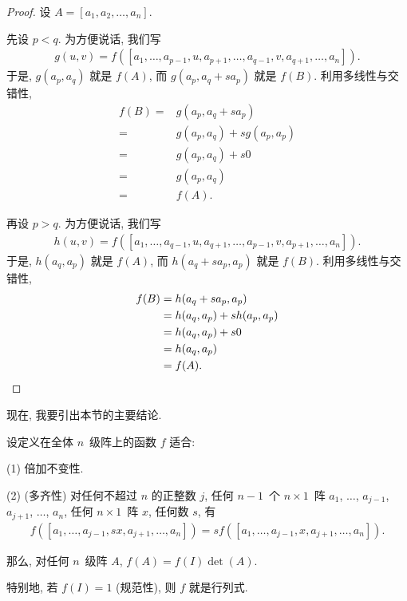 \begin{proof}
    设 \(A = [a_1, a_2, \dots, a_n]\).

    先设 \(p < q\).
    为方便说话, 我们写
    \begin{align*}
        g(u, v)
        = f {([a_1, \dots, a_{p-1}, u, a_{p+1}, \dots,
                        a_{q-1}, v, a_{q+1}, \dots, a_n])}.
    \end{align*}
    于是, \(g(a_p, a_q)\) 就是 \(f(A)\),
    而 \(g(a_p, a_q + sa_p)\) 就是 \(f(B)\).
    利用多线性与交错性,
    \begin{align*}
        f(B)
        = {} & g(a_p, a_q + sa_p)         \\
        = {} & g(a_p, a_q) + sg(a_p, a_p) \\
        = {} & g(a_p, a_q) + s0           \\
        = {} & g(a_p, a_q)                \\
        = {} & f(A).
    \end{align*}

    再设 \(p > q\).
    为方便说话, 我们写
    \begin{align*}
        h(u, v)
        = f {([a_1, \dots, a_{q-1}, u, a_{q+1}, \dots,
                        a_{p-1}, v, a_{p+1}, \dots, a_n])}.
    \end{align*}
    于是, \(h(a_q, a_p)\) 就是 \(f(A)\),
    而 \(h(a_q + sa_p, a_p)\) 就是 \(f(B)\).
    利用多线性与交错性,
    \begin{align*}
        f(B)
        = {} & h(a_q + sa_p, a_p)         \\
        = {} & h(a_q, a_p) + sh(a_p, a_p) \\
        = {} & h(a_q, a_p) + s0           \\
        = {} & h(a_q, a_p)                \\
        = {} & f(A).
        \qedhere
    \end{align*}
\end{proof}

现在, 我要引出本节的主要结论.

\begin{theorem}
    设定义在全体 \(n\)~级阵上的函数 \(f\) 适合:

    (1)
    倍加不变性.

    (2)
    (多齐性)
    对任何不超过 \(n\) 的正整数 \(j\),
    任何 \(n-1\)~个 \(n \times 1\)~阵
    \(a_1\), \(\dots\), \(a_{j-1}\),
    \(a_{j+1}\), \(\dots\), \(a_n\),
    任何 \(n \times 1\)~阵 \(x\),
    任何数 \(s\),
    有
    \begin{align*}
        f {([a_1, \dots, a_{j-1}, sx, a_{j+1}, \dots, a_n])}
        =
        s
        f {([a_1, \dots, a_{j-1}, x, a_{j+1}, \dots, a_n])}.
    \end{align*}

    那么, 对任何 \(n\)~级阵 \(A\),
    \(f(A) = f(I) \det {(A)}\).

    特别地, 若 \(f(I) = 1\) (规范性),
    则 \(f\) 就是行列式.
\end{theorem}

